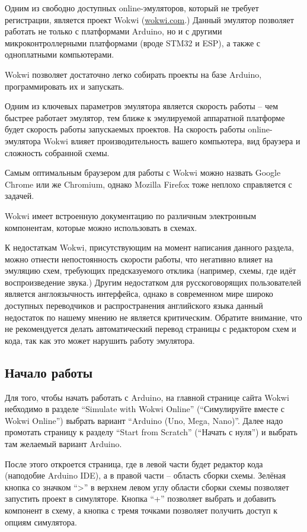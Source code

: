 \documentclass[../sparc.tex]{subfiles}
\begin{document}
Одним из свободно доступных online-эмуляторов, который не требует регистрации,
является проект Wokwi (\href{https://wokwi.com/}{wokwi.com}.)  Данный эмулятор
позволяет работать не только с платформами Arduino, но и с другими
микроконтроллерными платформами (вроде STM32 и ESP), а также с одноплатными
компьютерами.

Wokwi позволяет достаточно легко собирать проекты на базе Arduino,
программировать их и запускать.

Одним из ключевых параметров эмулятора является скорость работы -- чем быстрее
работает эмулятор, тем ближе к эмулируемой аппаратной платформе будет скорость
работы запускаемых проектов.  На скорость работы online-эмулятора Wokwi влияет
производительность вашего компьютера, вид браузера и сложность собранной схемы.

Самым оптимальным браузером для работы с Wokwi можно назвать Google Chrome или
же Chromium, однако Mozilla Firefox тоже неплохо справляется с задачей.

Wokwi имеет встроенную документацию по различным электронным компонентам,
которые можно использовать в схемах.

К недостаткам Wokwi, присутствующим на момент написания данного раздела, можно
отнести непостоянность скорости работы, что негативно влияет на эмуляцию схем,
требующих предсказуемого отклика (например, схемы, где идёт воспроизведение
звука.)  Другим недостатком для русскоговорящих пользователей является
англоязычность интерфейса, однако в современном мире широко доступных
переводчиков и распространения английского языка данный недостаток по нашему
мнению не является критическим.  Обратите внимание, что не рекомендуется делать
автоматический перевод страницы с редактором схем и кода, так как это может
нарушить работу эмулятора.

\subsection{Начало работы}

Для того, чтобы начать работать с Arduino, на главной странице сайта Wokwi
небходимо в разделе ``Simulate with Wokwi Online'' (``Симулируйте вместе с Wokwi
Online'') выбрать вариант ``Arduino (Uno, Mega, Nano)''.  Далее надо промотать
страницу к разделу ``Start from Scratch'' (``Начать с нуля'') и выбрать там
желаемый вариант Arduino.

После этого откроется страница, где в левой части будет редактор кода (наподобие
Arduino IDE), а в правой части -- область сборки схемы.  Зелёная кнопка со
значком ``>'' в верхнем левом углу области сборки схемы позволяет запустить
проект в симуляторе.  Кнопка ``+'' позволяет выбрать и добавить компонент в
схему, а кнопка с тремя точками позволяет получить доступ к опциям симулятора.
\end{document}
